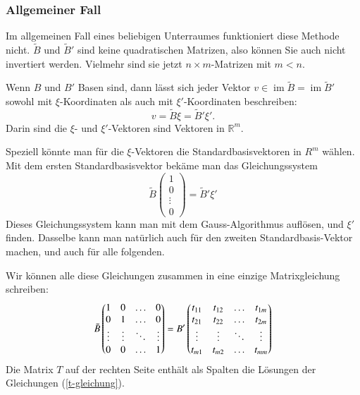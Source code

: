 \subsubsection{Allgemeiner Fall}
Im allgemeinen Fall eines beliebigen Unterraumes funktioniert diese
Methode nicht.
$\tilde B$ und $\tilde B'$ sind keine quadratischen
Matrizen, also können Sie auch nicht invertiert werden.
Vielmehr sind sie jetzt $n\times m$-Matrizen mit $m<n$.

Wenn $B$ und $B'$ Basen sind, dann lässt sich jeder Vektor $v\in
\operatorname{im}\tilde B=\operatorname{im}\tilde B'$ 
sowohl mit $\xi$-Koordinaten als auch mit $\xi'$-Koordinaten
beschreiben:
\[
v=\tilde B\xi=\tilde B'\xi'.
\]
Darin sind die $\xi$- und $\xi'$-Vektoren sind Vektoren in $\mathbb R^m$.

Speziell könnte man für die $\xi$-Vektoren die Standardbasisvektoren
in $R^m$ wählen.
Mit dem ersten Standardbasisvektor bekäme man
das Gleichungssystem
\begin{equation}
\tilde B\begin{pmatrix} 1\\0\\\vdots\\0\end{pmatrix}
=\tilde B'\xi'
\label{t-gleichung}
\end{equation}
Dieses Gleichungssystem kann man mit dem Gauss-Algorithmus auflösen,
und $\xi'$ finden.
Dasselbe kann man natürlich auch für den
zweiten Standardbasis-Vektor machen, und auch für alle folgenden.

Wir können alle diese Gleichungen zusammen in eine einzige
Matrixgleichung schreiben:
\[
\tilde B\begin{pmatrix}
1&0&\dots&0\\
0&1&\dots&0\\
\vdots&\vdots&\ddots&\vdots\\
0&0&\dots&1
\end{pmatrix}
=B'\begin{pmatrix}
\mathstrut t_{11}&t_{12}&\dots&t_{1m}\\
\mathstrut t_{21}&t_{22}&\dots&t_{2m}\\
\mathstrut \vdots&\vdots&\ddots&\vdots\\
\mathstrut t_{m1}&t_{m2}&\dots&t_{mm}\\
\end{pmatrix}
\]
Die Matrix $T$ auf der rechten Seite enthält als Spalten
die Lösungen der Gleichungen (\ref{t-gleichung}).

